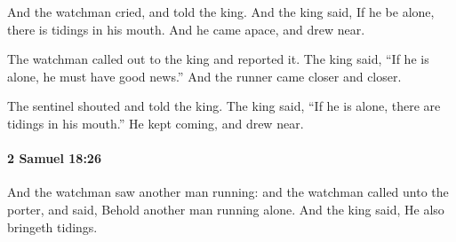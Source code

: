 			\begin{versebox}
					\item[BHS] 
					\item[ASV] And the watchman cried, and told the king. And the king said, If he be alone, there is tidings in his mouth. And he came apace, and drew near.
					\item[NIV] The watchman called out to the king and reported it. The king said, “If he is alone, he must have good news.” And the runner came closer and closer.
					\item[NRSV] The sentinel shouted and told the king. The king said, “If he is alone, there are tidings in his mouth.” He kept coming, and drew near.
			\end{versebox}

		\paragraph{2 Samuel 18:26} %
			\label{2SAMUEL-18-26}

			And the watchman saw another man running: and the watchman called unto the porter, and said, Behold another man running alone. And the king said, He also bringeth tidings.

